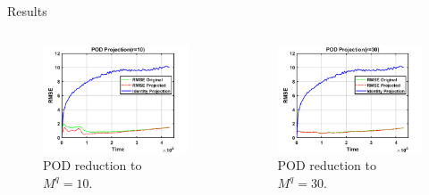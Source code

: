 \documentclass[aspectratio=169]{beamer}
\begin{document}
\begin{frame}{Results}
\vfill
\begin{columns}
    \begin{column}{.49\textwidth}
\begin{figure}[H]
\centering
\includegraphics[width=\textwidth]{figures/l96_pod10.png}
\caption{POD reduction to $M^q=10$.}
\end{figure}
\vfill
\end{column}

 \begin{column}{.49\textwidth}
\vfill
\begin{figure}[H]
\centering
\includegraphics[width=\textwidth]{figures/l96_pod30.png}
\caption{POD reduction to $M^q=30$.}
\end{figure}
 \end{column}
\end{columns}
\vfill
\end{frame}
\end{document}
